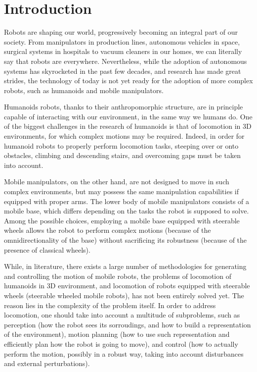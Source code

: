 \chapter{Introduction}
Robots are shaping our world, progressively becoming an integral part of our 
society. From manipulators in production lines, autonomous vehicles in 
space, surgical systems in hospitals to vacuum cleaners in our homes, we can 
literally say that robots are everywhere. Nevertheless, while the adoption of
autonomous systems has skyrocketed in the past few decades, and research has
made great strides, the technology of today
is not yet ready for the adoption of more complex robots, such as humanoids
and mobile manipulators.

Humanoids robots, thanks to their anthropomorphic structure, are in principle 
capable of interacting with our environment, in the same way we humans do.
One of the biggest challenges in the research of humanoids is that of 
locomotion in 3D environments, for which complex motions may be required.
Indeed, in order for humanoid robots to properly perform locomotion tasks, 
steeping over or onto obstacles, climbing and descending stairs, and 
overcoming gaps must be taken into account. 

Mobile manipulators, on the other hand, are not designed to move in such 
complex environments, but may possess the same manipulation capabilities if 
equipped with proper arms. The lower body of mobile manipulators consists
of a mobile base, which differs depending on the tasks the robot is
supposed to solve. Among the possible choices, employing a mobile base equipped 
with steerable wheels allows the robot to perform complex motions (because 
of the omnidirectionality of the base) without sacrificing its robustness
(because of the presence of classical wheels).

While, in literature, there exists a large number of methodologies for
generating and controlling the motion of mobile robots, the problems 
of locomotion of humanoids in 3D environment, and locomotion of robots 
equipped with steerable wheels (steerable wheeled mobile robots), has not been 
entirely solved yet. The reason lies in the complexity of the problem itself.
In order to address locomotion, one should take into account a multitude of 
subproblems, such as perception (how the robot sees its sorroudings,
and how to build a representation of the environment), motion 
planning (how to use such representation and efficiently plan how the robot 
is going to move), and control (how to actually perform the motion, possibly 
in a robust way, taking into account disturbances and external perturbations).

